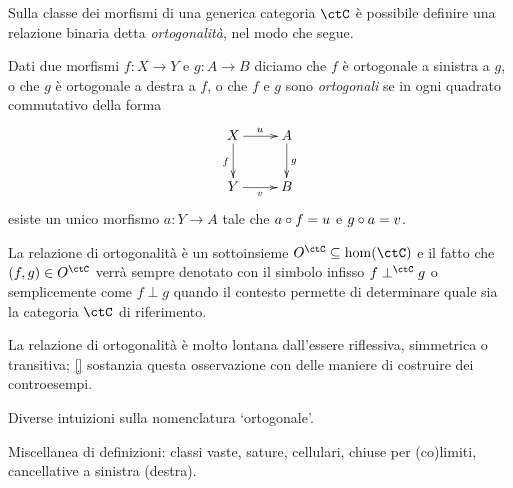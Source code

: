 Sulla classe dei morfismi di una generica categoria \(\ctC\) è possibile definire una relazione binaria detta \emph{ortogonalità}, nel modo che segue.
\begin{definition}\label{def_ortogona}
	Dati due morfismi \(f : X\to Y\) e \(g : A\to B\) diciamo che \(f\) è ortogonale a sinistra a \(g\), o che \(g\) è ortogonale a destra a \(f\), o che \(f\) e \(g\) sono \emph{ortogonali} se in ogni quadrato commutativo della forma
	\[
		\vcenter{\xymatrix{%
				X \ar[r]^u\ar[d]_f & A\ar[d]^g\\
				Y \ar[r]_v & B
			}}\]
	esiste un unico morfismo \(a : Y\to A\) tale che \(a\circ f=u\) e \(g\circ a=v\).
\end{definition}
La relazione di ortogonalità è un sottoinsieme \(O^\ctC \subseteq \hom(\ctC)\) e il fatto che \((f,g)\in O^\ctC\) verrà sempre denotato con il simbolo infisso \(f\perp^\ctC g\) o semplicemente come \(f\perp g\) quando il contesto permette di determinare quale sia la categoria \(\ctC\) di riferimento.

La relazione di ortogonalità è molto lontana dall'essere riflessiva, simmetrica o transitiva; \ref{} sostanzia questa osservazione con delle maniere di costruire dei controesempi.
\begin{remark}\label{perche_ortogonale}
	Diverse intuizioni sulla nomenclatura `ortogonale'.
\end{remark}
\begin{definition}
Miscellanea di definizioni: classi vaste, sature, cellulari, chiuse per (co)limiti, cancellative a sinistra (destra).
\end{definition}
